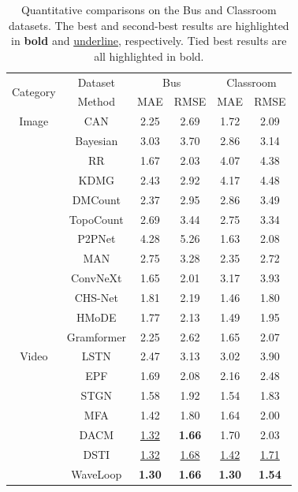 \documentclass[lettersize,journal]{IEEEtran}
\begin{document}
\begin{table}[h]
\caption{Quantitative comparisons on the Bus and Classroom datasets. The best and second-best results are highlighted in \textbf{bold} and \underline{underline}, respectively. Tied best results are all highlighted in bold.}
\centering
\scriptsize
\begin{tabular}{cccccc}
    \toprule
    \multirow{2}{*}{Category}&Dataset&\multicolumn{2}{c}{Bus}&\multicolumn{2}{c}{Classroom}\\
    &Method &MAE & RMSE&MAE & RMSE\\
    \midrule
   Image & CAN \cite{liu2019context} & 2.25 & 2.69 & 1.72 & 2.09 \\
   & Bayesian \cite{ma2019bayesian} &3.03 & 3.70 & 2.86 & 3.14 \\
   & RR \cite{wan2019residual} &  1.67 & 2.03 & 4.07 & 4.38 \\
   & KDMG \cite{wan2020kernel} &  2.43 & 2.92 & 4.17 & 4.48 \\
   & DMCount \cite{wang2020distribution} & 2.37 & 2.95 & 2.86 & 3.49 \\
   & TopoCount \cite{abousamra2021localization}  & 2.69 & 3.44 & 2.75 & 3.34 \\
   & P2PNet \cite{song2021rethinking}  & 4.28 & 5.26 & 1.63 & 2.08 \\ 
   & MAN \cite{lin2022boosting} & 2.75 & 3.28 & 2.35 & 2.72 \\ 
   & ConvNeXt \cite{liu2022convnet}  & 1.65 & 2.01 & 3.17 & 3.93 \\
   & CHS-Net \cite{dai2023cross} & 1.81 & 2.19 & 1.46 & 1.80 \\
   & HMoDE \cite{du2023redesigning} & 1.77 & 2.13 & 1.49 & 1.95 \\  
   & Gramformer \cite{lin2024gramformer}  & 2.25 & 2.62 & 1.65 & 2.07 \\  
   \midrule
   Video & LSTN \cite{fang2019locality} &  2.47 & 3.13 & 3.02 & 3.90 \\
   & EPF \cite{liu2020estimating} & 1.69 & 2.08 & 2.16 & 2.48 \\
   & STGN \cite{wu2022spatial} & 1.58 & 1.92 & 1.54 & 1.83 \\
   & MFA \cite{ling2023motional} & 1.42 & 1.80 & 1.64 & 2.00 \\ 
   & DACM \cite{ling2025dual} & \underline{1.32} & \textbf{1.66} & 1.70 & 2.03 \\ 
   & DSTI \cite{ling2026dual} & \underline{1.32} & \underline{1.68} & \underline{1.42} & \underline{1.71}  \\
   & WaveLoop  & \textbf{1.30} & \textbf{1.66} & \textbf{1.30} & \textbf{1.54} \\
    \bottomrule
\end{tabular}
\label{tab:1}
 \vspace{-1em}
\end{table}
\end{document}

